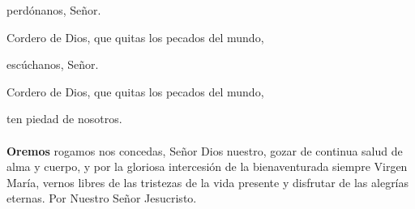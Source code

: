 {\hspace*{\fill}}perdónanos, Señor.

Cordero de Dios, que quitas los pecados del mundo,

{\hspace*{\fill}}escúchanos, Señor.

Cordero de Dios, que quitas los pecados del mundo,

{\hspace*{\fill}}ten piedad de nosotros.\\[2mm]
\\

\textbf{Oremos}
 rogamos nos concedas, Señor Dios nuestro, gozar de continua salud de alma y cuerpo, y por la gloriosa intercesión de la
bienaventurada siempre Virgen María, vernos libres de las tristezas de la vida presente y disfrutar de las alegrías eternas.
Por Nuestro Señor Jesucristo.\\ 